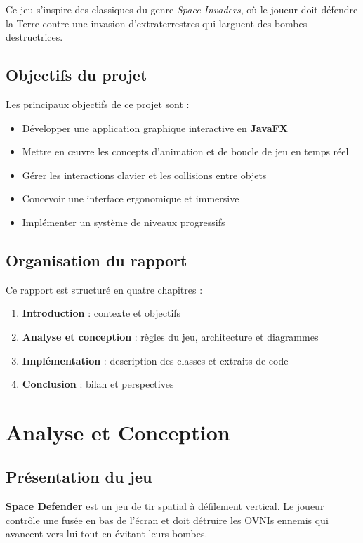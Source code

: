 \documentclass[12pt,a4paper]{report}
\begin{document}
Ce jeu s'inspire des classiques du genre \textit{Space Invaders}, où le joueur doit défendre la Terre contre une invasion d'extraterrestres qui larguent des bombes destructrices.

\section{Objectifs du projet}
Les principaux objectifs de ce projet sont :
\begin{itemize}[leftmargin=1.5cm]
  \item Développer une application graphique interactive en \textbf{JavaFX}
  \item Mettre en \oe{}uvre les concepts d'animation et de boucle de jeu en temps réel
  \item Gérer les interactions clavier et les collisions entre objets
  \item Concevoir une interface ergonomique et immersive
  \item Implémenter un système de niveaux progressifs
\end{itemize}

\section{Organisation du rapport}
Ce rapport est structuré en quatre chapitres :
\begin{enumerate}[leftmargin=1.5cm]
  \item \textbf{Introduction} : contexte et objectifs
  \item \textbf{Analyse et conception} : règles du jeu, architecture et diagrammes
  \item \textbf{Implémentation} : description des classes et extraits de code
  \item \textbf{Conclusion} : bilan et perspectives
\end{enumerate}

\chapter{Analyse et Conception}

\section{Présentation du jeu}
\textbf{Space Defender} est un jeu de tir spatial à défilement vertical. Le joueur contrôle une fusée en bas de l'écran et doit détruire les OVNIs ennemis qui avancent vers lui tout en évitant leurs bombes.
\end{document}
